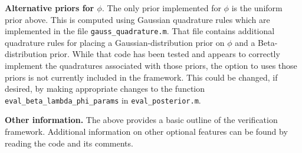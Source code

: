 \documentclass{book}
\begin{document}
\vspace{.1in}
\textbf{Alternative priors for $\phi$}. The only prior implemented for $\phi$ is the uniform prior above. This is
computed using Gaussian quadrature rules which are implemented in the file {\tt gauss\_quadrature.m}. That
file contains additional quadrature rules for placing a Gaussian-distribution prior on $\phi$ and a
Beta-distribution prior. While that code has been tested and appears to correctly implement the quadratures 
associated with those priors, the option to uses those priors is not currently included in the framework. This
could be changed, if desired, by making appropriate changes to the function {\tt eval\_beta\_lambda\_phi\_params} 
in {\tt eval\_posterior.m}. 

\vspace{.1in}
\textbf{Other information.} The above provides a basic outline of the verification framework. Additional information
on other optional features can be found by reading the code and its comments. 




\end{document}
